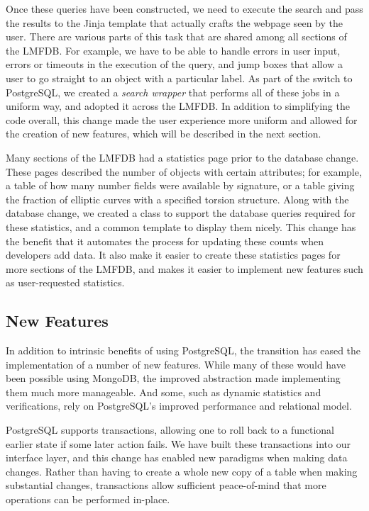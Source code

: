 \documentclass{article}
\begin{document}
Once these queries have been constructed, we need to execute the search and pass the results to the Jinja template that actually crafts the webpage seen by the user.
There are various parts of this task that are shared among all sections of the LMFDB.
For example, we have to be able to handle errors in user input, errors or timeouts in the execution of the query, and jump boxes that allow a user to go straight to an object with a particular label.
As part of the switch to PostgreSQL, we created a \emph{search wrapper} that performs all of these jobs in a uniform way, and adopted it across the LMFDB.
In addition to simplifying the code overall, this change made the user experience more uniform and allowed for the creation of new features, which will be described in the next section.

Many sections of the LMFDB had a statistics page prior to the database change.
These pages described the number of objects with certain attributes; for example, a table of how many number fields were available by signature, or a table giving the fraction of elliptic curves with a specified torsion structure.
Along with the database change, we created a class to support the database queries required for these statistics, and a common template to display them nicely.
This change has the benefit that it automates the process for updating these counts when developers add data.
It also make it easier to create these statistics pages for more sections of the LMFDB, and makes it easier to implement new features such as user-requested statistics.

\subsection{New Features}

In addition to intrinsic benefits of using PostgreSQL, the transition has eased the implementation of a number of new features.
While many of these would have been possible using MongoDB, the improved abstraction made implementing them much more manageable.
And some, such as dynamic statistics and verifications, rely on PostgreSQL's improved performance and relational model.

PostgreSQL supports transactions, allowing one to roll back to a functional earlier state if some later action fails.
We have built these transactions into our interface layer, and this change has enabled new paradigms when making data changes.
Rather than having to create a whole new copy of a table when making substantial changes, transactions allow sufficient peace-of-mind that more operations can be performed in-place.
\end{document}
